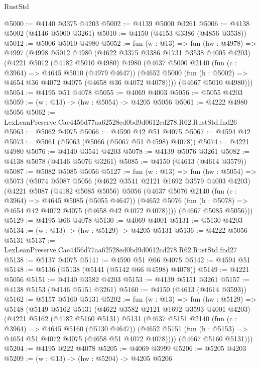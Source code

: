 \begin{lexlean}{RustStd}
\begin{coremodule}
@5000 := @4140 @3375 @4203
@5002 := @4139 @5000 @3261
@5006 := @4138 @5002 (@4146 @5000 @3261)
@5010 := @4150 (@4153 @3386 (@4856 @3538))
@5012 := @5006 @5010 @4980
@5052 := fun (w : @13) =>
  fun (hw : @4978) =>
  @4997
    (@4998
      @5012
      @4980
      (@4622 @3375 @3386 @1731 @3538 @4005 @4203)
      (@4221
        @5012
        (@4182 @5010 @4980)
        @4980
        (@4637
          @5000
          @2140
          (fun (c : @3964) => @4645 @5010 (@4979 @4647))
          (@4652 @5000 (fun (h : @5002) => @4654 @36 @4072 @4075 (@4658 @36 @4072 @4078))))
        (@4667 @5010 @4980)))
@5054 := @4195 @51 @4078
@5055 := @4069 @4003
@5056 := @5055 @4203
@5059 := (w : @13) -> (hw : @5054) -> @4205 @5056
@5061 := @4222 @4980 @5056
@5062 := LexLeanPreserve.Cae4456d77aa62528ed0bd9d0612cd278.R62.RustStd.fnd26
@5063 := @5062 @4075
@5066 := @4590 @42 @51 @4075
@5067 := @4594 @42
@5073 := @5061 (@5063 (@5066 (@5067 @51 @4598) @4078))
@5074 := @4221 @4980
@5076 := @4140 @3541 @4203
@5078 := @4139 @5076 @3261
@5082 := @4138 @5078 (@4146 @5076 @3261)
@5085 := @4150 (@4613 (@4614 @3579))
@5087 := @5082 @5085 @5056
@5127 := fun (w : @13) =>
  fun (hw : @5054) =>
  @5073
    (@5074
      @5087
      @5056
      (@4622 @3541 @2121 @1692 @3579 @4003 @4203)
      (@4221
        @5087
        (@4182 @5085 @5056)
        @5056
        (@4637
          @5076
          @2140
          (fun (c : @3964) => @4645 @5085 (@5055 @4647))
          (@4652 @5076 (fun (h : @5078) => @4654 @42 @4072 @4075 (@4658 @42 @4072 @4078))))
        (@4667 @5085 @5056)))
@5129 := @4195 @66 @4078
@5130 := @4069 @4001
@5131 := @5130 @4203
@5134 := (w : @13) -> (hw : @5129) -> @4205 @5131
@5136 := @4222 @5056 @5131
@5137 := LexLeanPreserve.Cae4456d77aa62528ed0bd9d0612cd278.R62.RustStd.fnd27
@5138 := @5137 @4075
@5141 := @4590 @51 @66 @4075
@5142 := @4594 @51
@5148 := @5136 (@5138 (@5141 (@5142 @66 @4598) @4078))
@5149 := @4221 @5056
@5151 := @4140 @3582 @4203
@5153 := @4139 @5151 @3261
@5157 := @4138 @5153 (@4146 @5151 @3261)
@5160 := @4150 (@4613 (@4614 @3593))
@5162 := @5157 @5160 @5131
@5202 := fun (w : @13) =>
  fun (hw : @5129) =>
  @5148
    (@5149
      @5162
      @5131
      (@4622 @3582 @2121 @1692 @3593 @4001 @4203)
      (@4221
        @5162
        (@4182 @5160 @5131)
        @5131
        (@4637
          @5151
          @2140
          (fun (c : @3964) => @4645 @5160 (@5130 @4647))
          (@4652 @5151 (fun (h : @5153) => @4654 @51 @4072 @4075 (@4658 @51 @4072 @4078))))
        (@4667 @5160 @5131)))
@5204 := @4195 @222 @4078
@5205 := @4069 @3999
@5206 := @5205 @4203
@5209 := (w : @13) -> (hw : @5204) -> @4205 @5206

\end{coremodule}
\end{lexlean}
